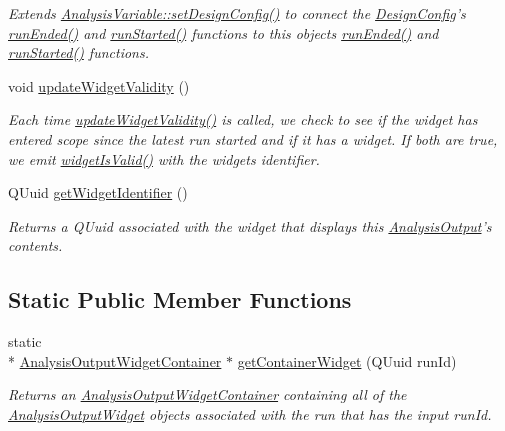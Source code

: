 \begin{DoxyCompactItemize}
\begin{DoxyCompactList}\small\item\em Extends \hyperlink{class_picto_1_1_asset_ae5606ab47c82a89034689a9423fb4daa}{Analysis\-Variable\-::set\-Design\-Config()} to connect the \hyperlink{class_picto_1_1_design_config}{Design\-Config}'s \hyperlink{class_picto_1_1_analysis_output_af968d07b76f3c28e7d23b207bb40e2be}{run\-Ended()} and \hyperlink{class_picto_1_1_analysis_output_ae7505f86ba3f249ddb6869318987c8f5}{run\-Started()} functions to this objects \hyperlink{class_picto_1_1_analysis_output_af968d07b76f3c28e7d23b207bb40e2be}{run\-Ended()} and \hyperlink{class_picto_1_1_analysis_output_ae7505f86ba3f249ddb6869318987c8f5}{run\-Started()} functions. \end{DoxyCompactList}\item 
\hypertarget{class_picto_1_1_analysis_output_aaeff8145c9f741e3c577128dc03d961a}{void \hyperlink{class_picto_1_1_analysis_output_aaeff8145c9f741e3c577128dc03d961a}{update\-Widget\-Validity} ()}\label{class_picto_1_1_analysis_output_aaeff8145c9f741e3c577128dc03d961a}

\begin{DoxyCompactList}\small\item\em Each time \hyperlink{class_picto_1_1_analysis_output_aaeff8145c9f741e3c577128dc03d961a}{update\-Widget\-Validity()} is called, we check to see if the widget has entered scope since the latest run started and if it has a widget. If both are true, we emit \hyperlink{class_picto_1_1_analysis_output_a459b96a480c7f6a4ae4fd63960f07b63}{widget\-Is\-Valid()} with the widgets identifier. \end{DoxyCompactList}\item 
Q\-Uuid \hyperlink{class_picto_1_1_analysis_output_a093574fc0610c897f7ae61145ca8a1eb}{get\-Widget\-Identifier} ()
\begin{DoxyCompactList}\small\item\em Returns a Q\-Uuid associated with the widget that displays this \hyperlink{class_picto_1_1_analysis_output}{Analysis\-Output}'s contents. \end{DoxyCompactList}\end{DoxyCompactItemize}
\subsection*{Static Public Member Functions}
\begin{DoxyCompactItemize}
\item 
static \\*
\hyperlink{class_picto_1_1_analysis_output_widget_container}{Analysis\-Output\-Widget\-Container} $\ast$ \hyperlink{class_picto_1_1_analysis_output_a8598720d301be74ad5639e2d08140c3c}{get\-Container\-Widget} (Q\-Uuid run\-Id)
\begin{DoxyCompactList}\small\item\em Returns an \hyperlink{class_picto_1_1_analysis_output_widget_container}{Analysis\-Output\-Widget\-Container} containing all of the \hyperlink{class_picto_1_1_analysis_output_widget}{Analysis\-Output\-Widget} objects associated with the run that has the input run\-Id. \end{DoxyCompactList}\end{DoxyCompactItemize}
